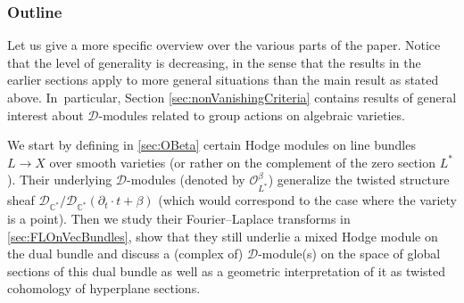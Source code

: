 \documentclass[11pt]{article}
\let\mathds\mathbb
\newcommand{\dC}{{\mathds C}}\let\C\dC
\newcommand{\cD}{\mathscr{D}}
\newcommand{\cO}{\mathcal{O}}\let\O\cO
\begin{document}
\subsubsection*{Outline}
Let us give a more specific overview over the various parts of the paper. Notice that the level of generality is decreasing, in the sense that the results in the earlier sections apply to more general situations than the main result as stated above. In~particular, Section \ref{sec:nonVanishingCriteria}
contains results of general interest about
$\cD$\nobreakdash-mod\-ules related to group actions on algebraic varieties.

We start by defining in \cref{sec:OBeta} certain Hodge modules on
line bundles \hbox{$L\!\to\! X$} over smooth varieties
(or rather on the complement of the zero section $L^*$). Their underlying $\mathscr{D}$\nobreakdash-mod\-ules (denoted by $\cO_{L^*}^\beta$) generalize the twisted structure sheaf \hbox{$\mathscr{D}_{\dC^*}/\mathscr{D}_{\dC^*}(\partial_t\cdot t + \beta)$}
(which would correspond to the case where the variety is a point).
Then we study their Fourier--Laplace transforms in \cref{sec:FLOnVecBundles}, show that they still underlie a mixed Hodge module on the dual bundle and discuss a (complex of) $\cD$\nobreakdash-mod\-ule(s) on the space of global sections of this dual bundle as well as a geometric interpretation of it as twisted cohomology of hyperplane sections.
\end{document}
